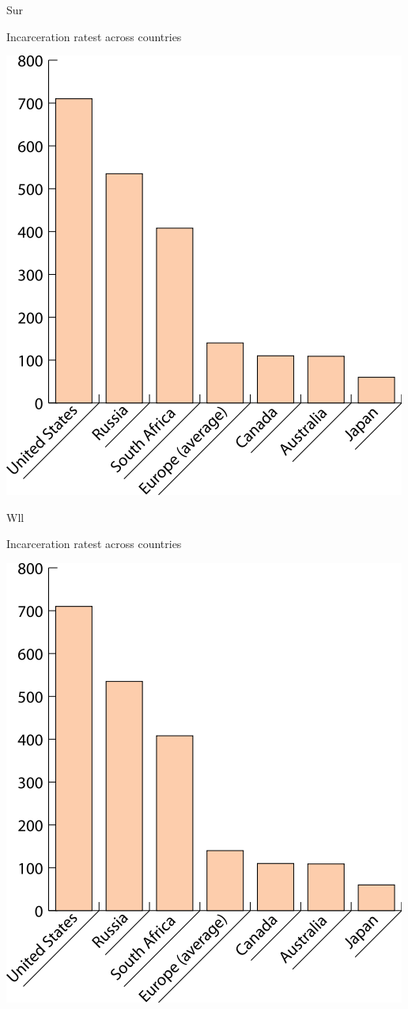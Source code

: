 \begin{map}{S}{ur}
\caption{Incarceration ratest across countries}
\label{chart:incarceration}
\includegraphics[width=\chartwidth,height=\chartheight]{incarceration}  
\end{map}

\begin{map}{W}{ll}
\caption{Incarceration ratest across countries}
\label{chart:incarceration}
\includegraphics[width=\chartwidth,height=\chartheight]{incarceration}  
\end{map}

